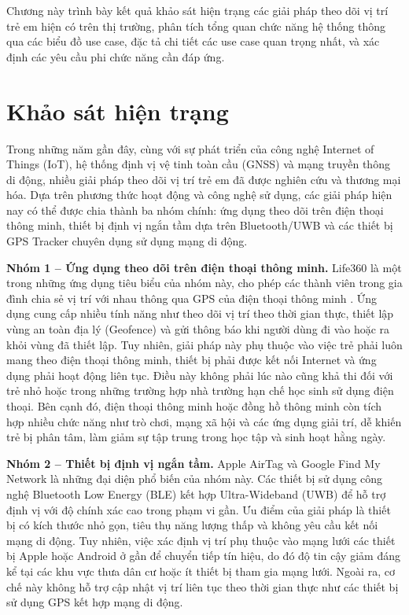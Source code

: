 \documentclass[../DoAn.tex]{subfiles}
\begin{document}
Chương này trình bày kết quả khảo sát hiện trạng các giải pháp theo dõi vị trí trẻ em hiện có trên thị trường, phân tích tổng quan chức năng hệ thống thông qua các biểu đồ use case, đặc tả chi tiết các use case quan trọng nhất, và xác định các yêu cầu phi chức năng cần đáp ứng.

\section{Khảo sát hiện trạng}
\label{section:2.1}

Trong những năm gần đây, cùng với sự phát triển của công nghệ Internet of Things (IoT), hệ thống định vị vệ tinh toàn cầu (GNSS) và mạng truyền thông di động, nhiều giải pháp theo dõi vị trí trẻ em đã được nghiên cứu và thương mại hóa. Dựa trên phương thức hoạt động và công nghệ sử dụng, các giải pháp hiện nay có thể được chia thành ba nhóm chính: ứng dụng theo dõi trên điện thoại thông minh, thiết bị định vị ngắn tầm dựa trên Bluetooth/UWB và các thiết bị GPS Tracker chuyên dụng sử dụng mạng di động.

\textbf{Nhóm 1 – Ứng dụng theo dõi trên điện thoại thông minh.} Life360 là một trong những ứng dụng tiêu biểu của nhóm này, cho phép các thành viên trong gia đình chia sẻ vị trí với nhau thông qua GPS của điện thoại thông minh \cite{life360}. Ứng dụng cung cấp nhiều tính năng như theo dõi vị trí theo thời gian thực, thiết lập vùng an toàn địa lý (Geofence) và gửi thông báo khi người dùng đi vào hoặc ra khỏi vùng đã thiết lập. Tuy nhiên, giải pháp này phụ thuộc vào việc trẻ phải luôn mang theo điện thoại thông minh, thiết bị phải được kết nối Internet và ứng dụng phải hoạt động liên tục. Điều này không phải lúc nào cũng khả thi đối với trẻ nhỏ hoặc trong những trường hợp nhà trường hạn chế học sinh sử dụng điện thoại. Bên cạnh đó, điện thoại thông minh hoặc đồng hồ thông minh còn tích hợp nhiều chức năng như trò chơi, mạng xã hội và các ứng dụng giải trí, dễ khiến trẻ bị phân tâm, làm giảm sự tập trung trong học tập và sinh hoạt hằng ngày.

\textbf{Nhóm 2 – Thiết bị định vị ngắn tầm.} Apple AirTag và Google Find My Network là những đại diện phổ biến của nhóm này. Các thiết bị sử dụng công nghệ Bluetooth Low Energy (BLE) kết hợp Ultra-Wideband (UWB) để hỗ trợ định vị với độ chính xác cao trong phạm vi gần. Ưu điểm của giải pháp là thiết bị có kích thước nhỏ gọn, tiêu thụ năng lượng thấp và không yêu cầu kết nối mạng di động. Tuy nhiên, việc xác định vị trí phụ thuộc vào mạng lưới các thiết bị Apple hoặc Android ở gần để chuyển tiếp tín hiệu, do đó độ tin cậy giảm đáng kể tại các khu vực thưa dân cư hoặc ít thiết bị tham gia mạng lưới. Ngoài ra, cơ chế này không hỗ trợ cập nhật vị trí liên tục theo thời gian thực như các thiết bị sử dụng GPS kết hợp mạng di động.
\end{document}
